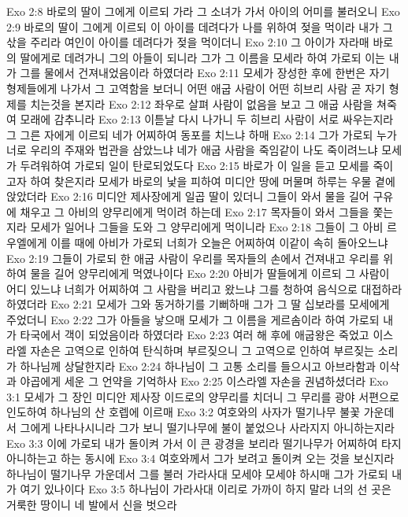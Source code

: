 Exo 2:8  바로의 딸이 그에게 이르되 가라 그 소녀가 가서 아이의 어미를 불러오니
Exo 2:9  바로의 딸이 그에게 이르되 이 아이를 데려다가 나를 위하여 젖을 먹이라 내가 그 삯을 주리라 여인이 아이를 데려다가 젖을 먹이더니
Exo 2:10  그 아이가 자라매 바로의 딸에게로 데려가니 그의 아들이 되니라 그가 그 이름을 모세라 하여 가로되 이는 내가 그를 물에서 건져내었음이라 하였더라
Exo 2:11  모세가 장성한 후에 한번은 자기 형제들에게 나가서 그 고역함을 보더니 어떤 애굽 사람이 어떤 히브리 사람 곧 자기 형제를 치는것을 본지라
Exo 2:12  좌우로 살펴 사람이 없음을 보고 그 애굽 사람을 쳐죽여 모래에 감추니라
Exo 2:13  이튿날 다시 나가니 두 히브리 사람이 서로 싸우는지라 그 그른 자에게 이르되 네가 어찌하여 동포를 치느냐 하매
Exo 2:14  그가 가로되 누가 너로 우리의 주재와 법관을 삼았느냐 네가 애굽 사람을 죽임같이 나도 죽이려느냐 모세가 두려워하여 가로되 일이 탄로되었도다
Exo 2:15  바로가 이 일을 듣고 모세를 죽이고자 하여 찾은지라 모세가 바로의 낯을 피하여 미디안 땅에 머물며 하루는 우물 곁에 앉았더라
Exo 2:16  미디안 제사장에게 일곱 딸이 있더니 그들이 와서 물을 길어 구유에 채우고 그 아비의 양무리에게 먹이려 하는데
Exo 2:17  목자들이 와서 그들을 쫓는지라 모세가 일어나 그들을 도와 그 양무리에게 먹이니라
Exo 2:18  그들이 그 아비 르우엘에게 이를 때에 아비가 가로되 너희가 오늘은 어찌하여 이같이 속히 돌아오느냐
Exo 2:19  그들이 가로되 한 애굽 사람이 우리를 목자들의 손에서 건져내고 우리를 위하여 물을 길어 양무리에게 먹였나이다
Exo 2:20  아비가 딸들에게 이르되 그 사람이 어디 있느냐 너희가 어찌하여 그 사람을 버리고 왔느냐 그를 청하여 음식으로 대접하라 하였더라
Exo 2:21  모세가 그와 동거하기를 기뻐하매 그가 그 딸 십보라를 모세에게 주었더니
Exo 2:22  그가 아들을 낳으매 모세가 그 이름을 게르솜이라 하여 가로되 내가 타국에서 객이 되었음이라 하였더라
Exo 2:23  여러 해 후에 애굽왕은 죽었고 이스라엘 자손은 고역으로 인하여 탄식하며 부르짖으니 그 고역으로 인하여 부르짖는 소리가 하나님께 상달한지라
Exo 2:24  하나님이 그 고통 소리를 들으시고 아브라함과 이삭과 야곱에게 세운 그 언약을 기억하사
Exo 2:25  이스라엘 자손을 권념하셨더라
Exo 3:1  모세가 그 장인 미디안 제사장 이드로의 양무리를 치더니 그 무리를 광야 서편으로 인도하여 하나님의 산 호렙에 이르매
Exo 3:2  여호와의 사자가 떨기나무 불꽃 가운데서 그에게 나타나시니라 그가 보니 떨기나무에 불이 붙었으나 사라지지 아니하는지라
Exo 3:3  이에 가로되 내가 돌이켜 가서 이 큰 광경을 보리라 떨기나무가 어찌하여 타지 아니하는고 하는 동시에
Exo 3:4  여호와께서 그가 보려고 돌이켜 오는 것을 보신지라 하나님이 떨기나무 가운데서 그를 불러 가라사대 모세야 모세야 하시매 그가 가로되 내가 여기 있나이다
Exo 3:5  하나님이 가라사대 이리로 가까이 하지 말라 너의 선 곳은 거룩한 땅이니 네 발에서 신을 벗으라
